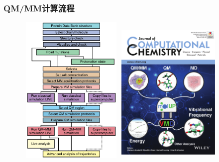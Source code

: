 \frame
{
	\frametitle{\textrm{QM/MM}计算流程}
\begin{figure}[h!]
\centering
\vspace{-8.0pt}
\includegraphics[height=2.85in,width=2.00in,viewport=0 0 550 818,clip]{Figures/QM-MM-workflow.png}
\includegraphics[height=2.75in,width=1.96in,viewport=0 0 600 790,clip]{Figures/cover-image-volume-39-issue-19-2018}
\label{QM/MM-Workflow}
\end{figure}
}


